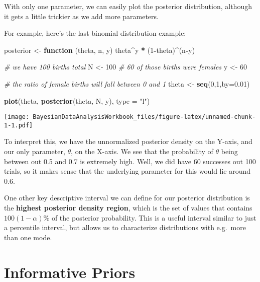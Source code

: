 \documentclass[]{book}
\newenvironment{Shaded}{\begin{snugshade}}{\end{snugshade}}
\newcommand{\KeywordTok}[1]{\textcolor[rgb]{0.13,0.29,0.53}{\textbf{#1}}}
\newcommand{\DataTypeTok}[1]{\textcolor[rgb]{0.13,0.29,0.53}{#1}}
\newcommand{\DecValTok}[1]{\textcolor[rgb]{0.00,0.00,0.81}{#1}}
\newcommand{\FloatTok}[1]{\textcolor[rgb]{0.00,0.00,0.81}{#1}}
\newcommand{\StringTok}[1]{\textcolor[rgb]{0.31,0.60,0.02}{#1}}
\newcommand{\CommentTok}[1]{\textcolor[rgb]{0.56,0.35,0.01}{\textit{#1}}}
\newcommand{\ControlFlowTok}[1]{\textcolor[rgb]{0.13,0.29,0.53}{\textbf{#1}}}
\newcommand{\OperatorTok}[1]{\textcolor[rgb]{0.81,0.36,0.00}{\textbf{#1}}}
\newcommand{\NormalTok}[1]{#1}
\begin{document}
With only one parameter, we can easily plot the posterior distribution,
although it gets a little trickier as we add more parameters.

For example, here's the last binomial distribution example:

\begin{Shaded}
\begin{Highlighting}[]
\NormalTok{posterior <-}\StringTok{ }\ControlFlowTok{function}\NormalTok{ (theta, n, y) theta}\OperatorTok{^}\NormalTok{y }\OperatorTok{*}\StringTok{ }\NormalTok{(}\DecValTok{1}\OperatorTok{-}\NormalTok{theta)}\OperatorTok{^}\NormalTok{(n}\OperatorTok{-}\NormalTok{y)}

\CommentTok{# we have 100 births total}
\NormalTok{N <-}\StringTok{ }\DecValTok{100}
\CommentTok{# 60 of those births were females}
\NormalTok{y <-}\StringTok{ }\DecValTok{60}

\CommentTok{# the ratio of female births will fall between 0 and 1}
\NormalTok{theta <-}\StringTok{ }\KeywordTok{seq}\NormalTok{(}\DecValTok{0}\NormalTok{,}\DecValTok{1}\NormalTok{,}\DataTypeTok{by=}\FloatTok{0.01}\NormalTok{)}

\KeywordTok{plot}\NormalTok{(theta, }\KeywordTok{posterior}\NormalTok{(theta, N, y), }\DataTypeTok{type =} \StringTok{"l"}\NormalTok{)}
\end{Highlighting}
\end{Shaded}

\texttt{[image: BayesianDataAnalysisWorkbook\_files/figure-latex/unnamed-chunk-1-1.pdf]}

To interpret this, we have the unnormalized posterior density on the
Y-axis, and our only parameter, \(\theta\), on the X-axis. We see that
the probability of \(\theta\) being between out 0.5 and 0.7 is extremely
high. Well, we did have 60 successes out 100 trials, so it makes sense
that the underlying parameter for this would lie around 0.6.

One other key descriptive interval we can define for our posterior
distribution is the \textbf{highest posterior density region}, which is
the set of values that contains \(100(1-\alpha)\%\) of the posterior
probability. This is a useful interval similar to just a percentile
interval, but allows us to characterize distributions with e.g.~more
than one mode.

\section{Informative Priors}\label{informative-priors}
\end{document}
